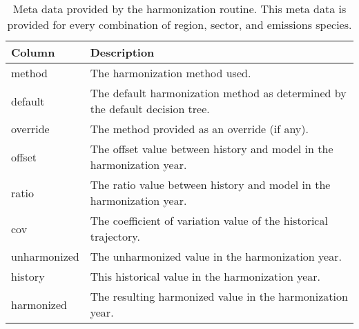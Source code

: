\begin{table}[]
\centering
\caption{Meta data provided by the  harmonization routine. This meta data is provided for every combination of region, sector, and emissions species.}
\label{tab:metadata}
\begin{tabular}{|p{2cm}|p{8cm}|}
\hline
Column       & Description                                                                  \\
\hline
\hline
method       & The harmonization method used.                                               \\
\hline
default      & The default harmonization method as determined by the default decision tree. \\
\hline
override     & The method provided as an override (if any).                                 \\
\hline
offset       & The offset value between history and model in the harmonization year.        \\
\hline
ratio        & The ratio value between history and model in the harmonization year.         \\
\hline
cov          & The coefficient of variation value of the historical trajectory.                           \\
\hline
unharmonized & The unharmonized value in the harmonization year.                            \\
\hline
history      & This historical value in the harmonization year.                             \\
\hline
harmonized   & The resulting harmonized value in the harmonization year.\\
\hline
\end{tabular}
\end{table}


